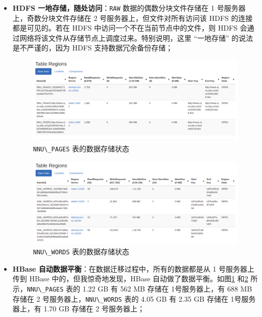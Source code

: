 \documentclass{ctexart}
\newcommand{\code}[1]{\colorbox{backcolor}{\lstinline|#1|}}
\begin{document}
    \begin{itemize}
        \item \textbf{HDFS 一地存储，随处访问}：\code{RAW} 数据的偶数分块文件存储在 1 号服务器上，奇数分块文件存储在 2 号服务器上，但文件对所有访问该 HDFS 的连接都是可见的。若在 HDFS 中访问一个不在当前节点中的文件，则 HDFS 会通过网络将该文件从存储节点上调度过来。特别说明，这里 “一地存储” 的说法是不严谨的，因为 HDFS 支持数据冗余备份存储；

        \begin{figure}[!h]
            \centering
            \includegraphics[width=\textwidth]{src/achievement_nnu-pages}
            \caption{\code{NNU\_PAGES} 表的数据存储状态}
            \label{fig:achievement_nnu-pages}
        \end{figure}

        \begin{figure}[!h]
            \centering
            \includegraphics[width=\textwidth]{src/achievement_nnu-words}
            \caption{\code{NNU\_WORDS} 表的数据存储状态}
            \label{fig:achievement_nnu-words}
        \end{figure}

        \item \textbf{HBase 自动数据平衡}：在数据迁移过程中，所有的数据都是从 1 号服务器上传到 HBase 中的，但我惊奇地发现，HBase 自动做了数据平衡。如图\ref{fig:achievement_nnu-pages} 和\ref{fig:achievement_nnu-words} 所示，\code{NNU\_PAGES} 表的 1.22 GB 有 562 MB 存储在 1号服务器上，有 688 MB 存储在 2 号服务器上，\code{NNU\_WORDS} 表的 4.05 GB 有 2.35 GB 存储在 1号服务器上，有 1.70 GB 存储在 2 号服务器上；
    \end{itemize}
\end{document}
